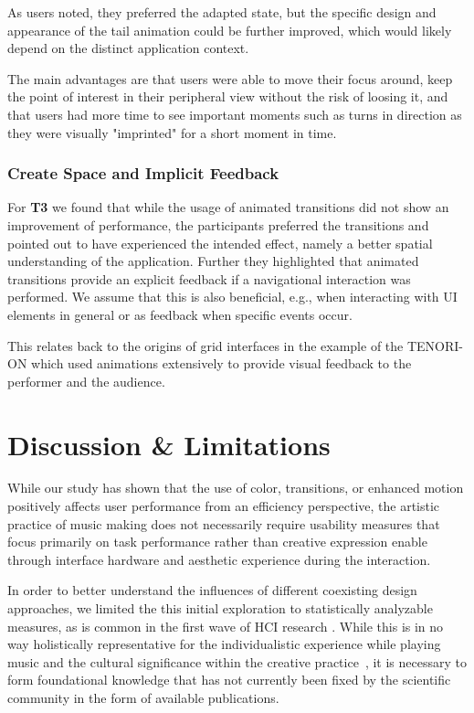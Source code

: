 \documentclass[sigconf]{nimeart}
\begin{document}
As users noted, they preferred the adapted state, but the specific design and appearance of the tail animation could be further improved, which would likely depend on the distinct application context.

The main advantages are that users were able to move their focus around, keep the point of interest in their peripheral view without the risk of loosing it, and that users had more time to see important moments such as turns in direction as they were visually "imprinted" for a short moment in time.

\subsubsection{Create Space and Implicit Feedback}\label{create-space-and-implicit-feedback}

For \textbf{T3} we found that while the usage of animated transitions did not show an improvement of performance, the participants preferred the transitions and pointed out to have experienced the intended effect, namely a better spatial understanding of the application. Further they highlighted that animated transitions provide an explicit feedback if a navigational interaction was performed. We assume that this is also beneficial, e.g., when interacting with UI elements in general or as feedback when specific events occur.

This relates back to the origins of grid interfaces in the example of the TENORI-ON \cite{Nishibori2006} which used animations extensively to provide visual feedback to the performer and the audience.

\section{Discussion \& Limitations}\label{discussion-limitations}

While our study has shown that the use of color, transitions, or enhanced motion positively affects user performance from an efficiency perspective, the artistic practice of music making does not necessarily require usability measures that focus primarily on task performance rather than creative expression enable through interface hardware \cite{10.1145U002F3430524.3440628,10.1145U002F3290607.3313245} and aesthetic experience during the interaction.

In order to better understand the influences of different coexisting design approaches, we limited the this initial exploration to statistically analyzable measures, as is common in the first wave of HCI research \cite{inproceedings,10.1145U002F2317956.2317968}. While this is in no way holistically representative for the individualistic experience while playing music and the cultural significance within the creative practice~\cite{10.1145U002F3033701.3033740}, it is necessary to form foundational knowledge that has not currently been fixed by the scientific community in the form of available publications.
\end{document}
